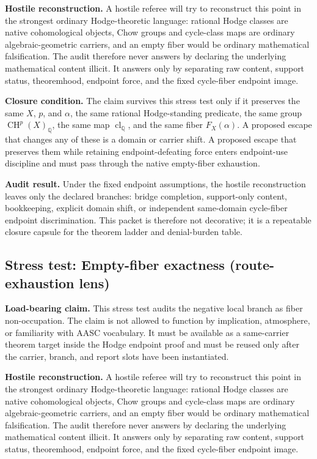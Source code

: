 \documentclass[11pt]{article}
\newcommand{\QQ}{\mathbb{Q}}
\newcommand{\CH}{\operatorname{CH}}
\newcommand{\clQ}{\operatorname{cl}_{\QQ}}
\begin{document}
\par\noindent\textbf{Hostile reconstruction.} A hostile referee will try to reconstruct this point in the strongest ordinary Hodge-theoretic language: rational Hodge classes are native cohomological objects, Chow groups and cycle-class maps are ordinary algebraic-geometric carriers, and an empty fiber would be ordinary mathematical falsification. The audit therefore never answers by declaring the underlying mathematical content illicit. It answers only by separating raw content, support status, theoremhood, endpoint force, and the fixed cycle-fiber endpoint image.

\par\noindent\textbf{Closure condition.} The claim survives this stress test only if it preserves the same $X$, $p$, and $\alpha$, the same rational Hodge-standing predicate, the same group $\CH^p(X)_\QQ$, the same map $\clQ$, and the same fiber $F_X(\alpha)$. A proposed escape that changes any of these is a domain or carrier shift. A proposed escape that preserves them while retaining endpoint-defeating force enters endpoint-use discipline and must pass through the native empty-fiber exhaustion.

\par\noindent\textbf{Audit result.} Under the fixed endpoint assumptions, the hostile reconstruction leaves only the declared branches: bridge completion, support-only content, bookkeeping, explicit domain shift, or independent same-domain cycle-fiber endpoint discrimination. This packet is therefore not decorative; it is a repeatable closure capsule for the theorem ladder and denial-burden table.


\subsection{Stress test: Empty-fiber exactness (route-exhaustion lens)}

\par\noindent\textbf{Load-bearing claim.} This stress test audits the negative local branch as fiber non-occupation. The claim is not allowed to function by implication, atmosphere, or familiarity with AASC vocabulary. It must be available as a same-carrier theorem target inside the Hodge endpoint proof and must be reused only after the carrier, branch, and report slots have been instantiated.

\par\noindent\textbf{Hostile reconstruction.} A hostile referee will try to reconstruct this point in the strongest ordinary Hodge-theoretic language: rational Hodge classes are native cohomological objects, Chow groups and cycle-class maps are ordinary algebraic-geometric carriers, and an empty fiber would be ordinary mathematical falsification. The audit therefore never answers by declaring the underlying mathematical content illicit. It answers only by separating raw content, support status, theoremhood, endpoint force, and the fixed cycle-fiber endpoint image.
\end{document}
